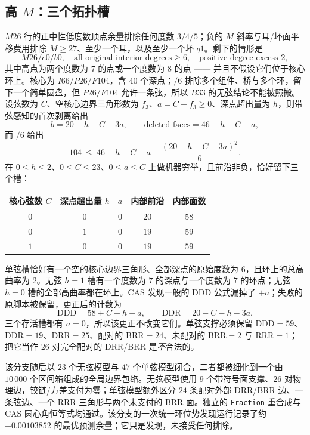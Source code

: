 \subsection{高 $M$：三个拓扑槽}

$M26$ 行的正中性低度数顶点余量排除任何度数 $3/4/5$；负的 $M$ 斜率与耳/坏面平移费用排除 $M\ge27$、至少一个耳，以及至少一个坏 $q1$。剩下的情形是
\[
M26/e0/b0,\quad\text{all original interior degrees}\ge6,\quad\text{positive degree excess }2,
\]
其中高点为两个度数为 $7$ 的点或一个度数为 $8$ 的点 —— 并且不假设它们位于核心环上。核心为 $I66/P26/F104$，含 $40$ 个深点；$/6$ 排除多个组件、桥与多个环，留下一个简单圆盘，但 $P26/F104$ 允许一条弦，所以 $B33$ 的无弦结论不能被照搬。设弦数为 $C$、空核心边界三角形数为 $f_3$、$a=C-f_3\ge0$、深点超出量为 $h$，则带弦感知的首次剥离给出
\[
b=20-h-C-3a,\qquad \text{deleted faces}=46-h-C-a,
\]
而 $/6$ 给出
\[
104\ \le\ 46-h-C-a+\frac{(20-h-C-3a)^2}{6}.
\]
在 $0\le h\le2$、$0\le C\le23$、$0\le a\le C$ 上做机器穷举，且前沿非负，恰好留下三个槽：

\begin{center}
\footnotesize
\begin{tabular}{@{}ccccc@{}}
\toprule
核心弦数 $C$ & 深点超出量 $h$ & $a$ & 内部前沿 & 内部面数 \\
\midrule
$0$ & $0$ & $0$ & $20$ & $58$ \\
$0$ & $1$ & $0$ & $19$ & $59$ \\
$1$ & $0$ & $0$ & $19$ & $59$ \\
\bottomrule
\end{tabular}
\end{center}

单弦槽恰好有一个空的核心边界三角形、全部深点的原始度数为 $6$，且环上的总高曲率为 $2$。无弦 $h=1$ 槽有一个度数为 $7$ 的深点与一个度数为 $7$ 的环点；无弦 $h=0$ 槽的全部高曲率都在环上。CAS 发现一般的 DDD 公式漏掉了 $+a$；失败的原脚本被保留，更正后的计数为
\[
\mathrm{DDD}=58+C+h+a,\qquad \mathrm{DDR}=20-C-h-3a .
\]
三个存活槽都有 $a=0$，所以该更正不改变它们。单弦支撑必须保留 $\mathrm{DDD}=59$、$\mathrm{DDR}=19$、$\mathrm{DRR}=25$、配对的 $\mathrm{BRR}=24$、未配对的 $\mathrm{BRR}=2$ 与 $\mathrm{RRR}=1$；把它当作 $26$ 对完全配对的 DRR/BRR 是\emph{不}合法的。

该分支随后以 $23$ 个无弦模型与 $47$ 个单弦模型闭合，二者都被细化到一个由 $10\,000$ 个区间箱组成的全局边界包络。无弦模型使用 $9$ 个带符号面支撑、$26$ 对物理边，铰链/方差支付为零；单弦模型额外区分 $24$ 条配对外部 DRR/BRR 边、一条弦边、一个 RRR 三角形与两个未支付的 BRR 面。独立的 \texttt{Fraction} 重合成与 CAS 圆心角恒等式均通过。该分支的一次统一环位势发现运行记录了约 $-0.00103852$ 的最优预测余量；它只是发现，未接受任何排除。

